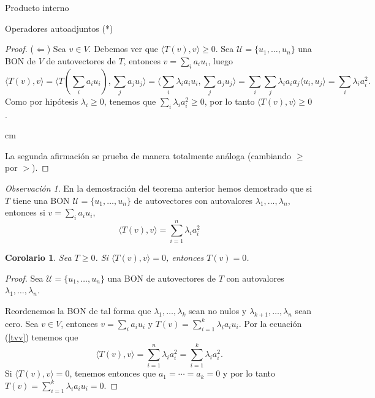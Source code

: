 \documentclass[a4paper,12pt,twoside,spanish,reqno]{amsbook}
\numberwithin{equation}{section}
\newtheorem{corolario}[teorema]{Corolario}
\theoremstyle{definition}
\theoremstyle{remark}
\newtheorem*{obs*}{Observaci\'on}
\newcommand{\la}{\langle}
\newcommand{\ra}{\rangle}
\begin{document}
\begin{chapter}{Producto interno}
\begin{section}{Operadores autoadjuntos (*)}
\begin{proof}
            
            ($\Leftarrow$) Sea $v \in V$. Debemos ver que $ \la T(v),v \ra \ge 0$.  Sea $\mathcal{U} = \{u_1,\ldots,u_n\}$  una BON de $V$ de autovectores de $T$, entonces $v = \sum_i a_i u_i$, luego
            $$
             \la T(v),v \ra  =  \la T(\sum_i a_i u_i),\sum_j a_j u_j \ra =  \la \sum_i \lambda_i a_i u_i,\sum_j a_j u_j \ra  =  \sum_i\sum_j\lambda_i a_ia_j\la  u_i,  u_j \ra = \sum_i\lambda_i a_i^2.
            $$ 
            Como por hipótesis $\lambda_i \ge 0$, tenemos que $\sum_i\lambda_i a_i^2\ge 0$, por lo tanto $ \la T(v),v \ra \ge 0$.
            
             cm
            
            La segunda afirmación se prueba de manera totalmente análoga (cambiando $\ge$ por $>$).
        \end{proof}
        
        \begin{obs*}
            En la demostración del teorema anterior hemos demostrado  que si $T$ tiene una BON $\mathcal{U} = \{u_1,\ldots,u_n\}$ de autovectores con  autovalores $\lambda_1,\ldots,\lambda_n$, entonces si 
            $v = \sum_i a_i u_i$, 
            \begin{equation}\label{tvv}
            \la T(v),v \ra  =  \sum_{i=1}^n\lambda_i a_i^2
            \end{equation} 
        \end{obs*}
        
        
        \begin{corolario}\label{coro1} 
         Sea $T \ge 0$. Si $\la T(v), v \ra = 0$, entonces $T(v)=0$.
        \end{corolario}
        \begin{proof}
            Sea $\mathcal{U} = \{u_1,\ldots,u_n\}$ una BON de autovectores de $T$  con  autovalores $\lambda_1,\ldots,\lambda_n$.
            
            Reordenemos la BON de tal forma que $\lambda_1,\ldots,\lambda_k$ sean no nulos y   $\lambda_{k+1},\ldots,\lambda_n$ sean cero. Sea $v \in V$, entonces $v = \sum_i a_i u_i$ y $T(v) = \sum_{i=1}^k \lambda_ia_i u_i$.  Por la ecuación (\ref{tvv}) tenemos  que 
            $$
            \la T(v),v \ra  = \sum_{i=1}^n\lambda_i a_i^2 = \sum_{i=1}^k\lambda_i a_i^2.
            $$
            Si $\la T(v),v \ra  = 0$, tenemos entonces que $a_1= \cdots=a_k =0$ y por lo tanto $T(v) = \sum_{i=1}^k \lambda_ia_i u_i = 0$.
            
        
        \end{proof}
        

\end{section}
\end{chapter}
\end{document}
